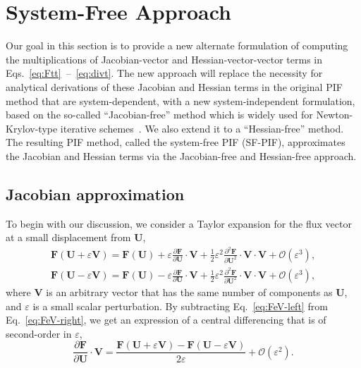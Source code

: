 \documentclass[times,preprint,3p]{elsarticle}
\newcommand{\pd}[2]{\frac{\partial #1}{\partial #2}}
\newcommand{\pdd}[2]{\frac{\partial^{2} #1}{\partial #2^{2}}}
\newcommand{\bF}{\mathbf{F}}
\newcommand{\bU}{\mathbf{U}}
\newcommand{\bV}{\mathbf{V}}
\begin{document}
\section{System-Free Approach}\label{sec:system-free}

Our goal in this section is to provide a new alternate formulation of computing
the multiplications of Jacobian-vector and Hessian-vector-vector terms in Eqs.~\eqref{eq:Ftt}~--~\eqref{eq:divt}.
The new approach will replace the necessity for analytical derivations of
these Jacobian and Hessian terms  in the original PIF method that
are system-dependent,
with a new system-independent formulation, based on
the so-called ``Jacobian-free'' method which
is widely used for Newton-Krylov-type iterative
schemes~\cite{brown1990hybrid, knoll2004jacobian, knoll2011application, gear1983iterative}.
We also extend it to a ``Hessian-free'' method.
The resulting PIF method, called the system-free PIF (SF-PIF),
approximates the Jacobian and Hessian terms via
the Jacobian-free and Hessian-free approach.


\subsection{Jacobian approximation}\label{subsec:jac-approx}
To begin with our discussion,
we consider a Taylor expansion for the flux vector at a small displacement from \( \bU \),
\begin{subequations}\label{eq:FeV}
    \begin{align}
        \label{eq:FeV-right}\bF ( \bU + \varepsilon \bV) =
        \bF(\bU) + \varepsilon \pd{\bF}{\bU} \cdot \bV +
        \frac{1}{2} \varepsilon^{2} \pdd{\bF}{\bU} \cdot \bV \cdot \bV + \mathcal{O}(\varepsilon^{3}), \\
        \label{eq:FeV-left}\bF ( \bU - \varepsilon \bV) =
        \bF(\bU) - \varepsilon \pd{\bF}{\bU} \cdot \bV +
        \frac{1}{2} \varepsilon^{2} \pdd{\bF}{\bU} \cdot \bV \cdot \bV + \mathcal{O}(\varepsilon^{3}),
    \end{align}
\end{subequations}
where \( \bV \) is an arbitrary vector that has
the same number of components as \( \bU \), and \( \varepsilon \) is a
small scalar perturbation.
By subtracting Eq.~\eqref{eq:FeV-left} from Eq.~\eqref{eq:FeV-right},
we get an expression of a central differencing that is of second-order in $\varepsilon$,
\begin{equation}\label{eq:jac-free}
    \pd{\bF}{\bU} \cdot \bV =
    \frac{\bF(\bU + \varepsilon \bV) - \bF(\bU - \varepsilon \bV)}{2\varepsilon}
    + \mathcal{O}(\varepsilon^{2}).
\end{equation}
\end{document}
